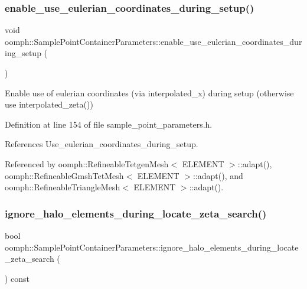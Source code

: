 \subsubsection{\texorpdfstring{enable\+\_\+use\+\_\+eulerian\+\_\+coordinates\+\_\+during\+\_\+setup()}{enable\_use\_eulerian\_coordinates\_during\_setup()}}
{\footnotesize\ttfamily void oomph\+::\+Sample\+Point\+Container\+Parameters\+::enable\+\_\+use\+\_\+eulerian\+\_\+coordinates\+\_\+during\+\_\+setup (\begin{DoxyParamCaption}{ }\end{DoxyParamCaption})\hspace{0.3cm}{\ttfamily [inline]}}

Enable use of eulerian coordinates (via interpolated\+\_\+x) during setup (otherwise use interpolated\+\_\+zeta()) 

Definition at line 154 of file sample\+\_\+point\+\_\+parameters.\+h.



References Use\+\_\+eulerian\+\_\+coordinates\+\_\+during\+\_\+setup.



Referenced by oomph\+::\+Refineable\+Tetgen\+Mesh$<$ E\+L\+E\+M\+E\+N\+T $>$\+::adapt(), oomph\+::\+Refineable\+Gmsh\+Tet\+Mesh$<$ E\+L\+E\+M\+E\+N\+T $>$\+::adapt(), and oomph\+::\+Refineable\+Triangle\+Mesh$<$ E\+L\+E\+M\+E\+N\+T $>$\+::adapt().

\mbox{\label{classoomph_1_1SamplePointContainerParameters_a436175c53c2801c510673146cdb75761}} 
\subsubsection{\texorpdfstring{ignore\+\_\+halo\+\_\+elements\+\_\+during\+\_\+locate\+\_\+zeta\+\_\+search()}{ignore\_halo\_elements\_during\_locate\_zeta\_search()}}
{\footnotesize\ttfamily bool oomph\+::\+Sample\+Point\+Container\+Parameters\+::ignore\+\_\+halo\+\_\+elements\+\_\+during\+\_\+locate\+\_\+zeta\+\_\+search (\begin{DoxyParamCaption}{ }\end{DoxyParamCaption}) const\hspace{0.3cm}{\ttfamily [inline]}}



